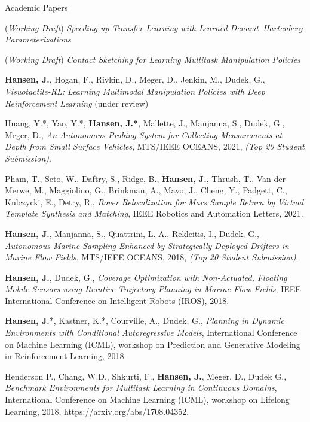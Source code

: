 \documentclass{resume} %
\begin{document}
	\vspace{-.5cm}
\begin{rSection}{Academic Papers}

(\emph{Working Draft}) \textit{Speeding up Transfer Learning with Learned Denavit–Hartenberg Parameterizations}

(\emph{Working Draft}) \textit{Contact Sketching for Learning Multitask Manipulation Policies}

\textbf{Hansen, J.}, Hogan, F., Rivkin, D., Meger, D., Jenkin, M., Dudek, G., \textit{Visuotactile-RL: Learning Multimodal Manipulation Policies with Deep Reinforcement Learning} (under review)

%

Huang, Y.*, Yao, Y.*, \textbf{Hansen, J.*}, Mallette, J., Manjanna, S., Dudek, G.,  Meger, D., \textit{An Autonomous Probing System for Collecting Measurements at Depth from Small Surface Vehicles}, MTS/IEEE OCEANS, 2021, \emph{{(Top 20 Student Submission)}}.

Pham, T., Seto, W., Daftry, S., Ridge, B., \textbf{Hansen, J.}, Thrush, T., Van der Merwe, M., Maggiolino, G., Brinkman, A., Mayo, J., Cheng, Y., Padgett, C., Kulczycki, E., Detry, R., \textit{Rover Relocalization for Mars Sample Return by Virtual Template Synthesis and Matching},  IEEE Robotics and Automation Letters, 2021.

\textbf{Hansen, J.}, Manjanna, S.,  Quattrini, L. A., Rekleitis, I., Dudek, G., \textit{Autonomous Marine Sampling Enhanced by Strategically Deployed Drifters in Marine Flow Fields}, MTS/IEEE OCEANS, 2018, \emph{{(Top 20 Student Submission)}}.

\textbf{Hansen, J.}, Dudek, G., \textit{Coverage Optimization with Non-Actuated, Floating Mobile Sensors using Iterative Trajectory Planning in Marine Flow Fields}, IEEE International Conference on Intelligent Robots (IROS), 2018.

\textbf{Hansen, J.}*, Kastner, K.*, Courville, A., Dudek, G.,  \textit{Planning in Dynamic Environments with Conditional Autoregressive Models}, International Conference on Machine Learning (ICML), workshop on Prediction and Generative Modeling in Reinforcement Learning, 2018.

Henderson P., Chang, W.D., Shkurti, F., \textbf{Hansen, J.}, Meger, D., Dudek G., 
\textit{Benchmark Environments for Multitask Learning in Continuous Domains}, International Conference on Machine Learning (ICML), workshop on Lifelong Learning, 2018, https://arxiv.org/abs/1708.04352. 


\end{rSection}
\end{document}
